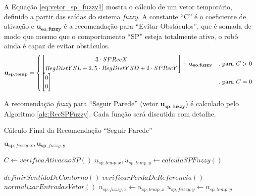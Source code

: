 	A Equação \ref{eq:vetor_sp_fuzzy1} mostra o cálculo de um vetor temporário, definido a 
	partir das saídas do sistema \textit{fuzzy}. A constante ``C'' é o coeficiente de ativação
	e $\mathbf{u_{eo,fuzzy}}$ é a recomendação para ``Evitar Obstáculos'', que é somada
	de modo que mesmo que o comportamento ``SP'' esteja totalmente ativo, o robô ainda é capaz
	de evitar obstáculos. 
	\begin{equation}
		\label{eq:vetor_sp_fuzzy1}
			\mathbf{u_{sp,temp}} =
			\begin{cases}
			 
			\mleft[
			\begin{matrix}
		  		3 \cdot SPRecX \\
		  		RegDistYSL + 2,5 \cdot RegDistYSD + 2 \cdot SPRecY \\
			\end{matrix}
			\mright] + \mathbf{u_{eo,fuzzy}} & \text{, para} \ C > 0 \\
			
			\mleft[
			\begin{matrix}
		  		0 \\
		  		0 \\
			\end{matrix}
			\mright]  & \text{, para} \ C = 0 \\
			
			\end{cases}
	\end{equation}

	A recomendação \textit{fuzzy} para ``Seguir Parede'' (vetor $\mathbf{u_{sp,fuzzy}}$)
	é calculado pelo Algoritmo \ref{alg:RecSPFuzzy}. Cada função será discutida com detalhe. 
	\begin{algorithm}
		\caption{Cálculo Final da Recomendação ``Seguir Parede''}
		\label{alg:RecSPFuzzy}%
		\begin{algorithmic}[1]
	
		\ENSURE $\mathbf{u_{sp,\mathit{fuzzy}, x}}, \mathbf{u_{sp,\mathit{fuzzy}, y}}$
		
		\STATE $C \leftarrow verificaAtivacaoSP()$
		\STATE $u_{sp,temp,x}, u_{sp,temp,y} \leftarrow calculaSPFuzzy()$
		
			\STATE $definirSentidoDeContorno()$
			\STATE $verificarPerdaDeReferencia()$
			\STATE $normalizarEntradasVetor()$
		\ELSE
			\STATE $u_{sp,\mathit{fuzzy}, x} \leftarrow u_{sp,temp,x}$
			\STATE $u_{sp,\mathit{fuzzy}, y} \leftarrow u_{sp,temp,y}$
		\ENDIF
	
		\end{algorithmic}
	\end{algorithm}
	
